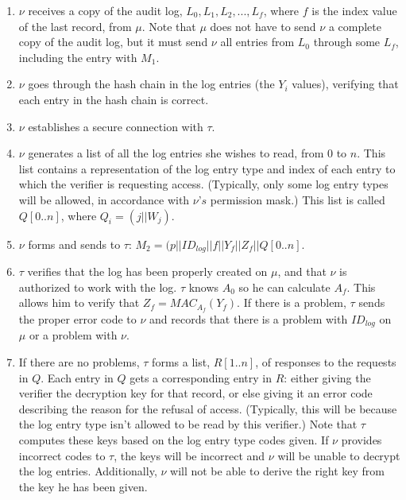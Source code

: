 \documentclass[12pt, letter]{article}
\begin{document}
\begin{enumerate}
    \item  $\nu$ receives a copy of the audit log, $L_0, L_1, L_2,...,L_f$, where $f$ is the index value of the last record, from $\mu$. Note that $\mu$ does not have to send $\nu$ a complete copy of the audit log, but it must send $\nu$ all entries from $L_0$ through some $L_f$, including the entry with $M_1$.
    
    \item $\nu$ goes through the hash chain in the log entries (the $Y_i$ values), verifying that each entry in the hash chain is correct.
    
    \item $\nu$ establishes a secure connection with $\tau$.

    \item $\nu$ generates a list of all the log entries she wishes to read, from $0$ to $n$. This list contains a representation of the log entry type and index of each entry to which the verifier is requesting access. (Typically, only some log entry types will be allowed, in accordance with $\nu’s$ permission mask.) This list is called $Q[0..n]$, where $Q_i = (j||W_j)$.
    
    \item $\nu$ forms and sends to $\tau$: $M_2 = (p||ID_{log}||f||Y_f||Z_f||Q[0..n]$.
    
    \item $\tau$ verifies that the log has been properly created on $\mu$, and that $\nu$ is authorized to work with the log. $\tau$ knows $A_0$ so he can calculate $A_f$. This allows him to verify that $Z_f = MAC_{A_f}(Y_f)$. If there is a problem, $\tau$ sends the proper error code to $\nu$ and records that there is a problem with $ID_{log}$ on $\mu$ or a problem with $\nu$.

    \item If there are no problems, $\tau$ forms a list, $R[1..n]$, of responses to the requests in $Q$. Each entry in $Q$ gets a corresponding entry in $R$: either giving the verifier the decryption key for that record, or else giving it an error code describing the reason for the refusal of access. (Typically, this will be because the log entry type isn’t allowed to be read by this verifier.) Note that $\tau$ computes these keys based on the log entry type codes given. If $\nu$ provides incorrect codes to $\tau$, the keys will be incorrect and $\nu$ will be unable to decrypt the log entries. Additionally, $\nu$ will not be able to derive the right key from the key he has been given.


\end{enumerate}
\end{document}
